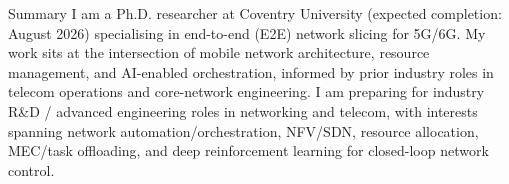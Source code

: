 \documentclass{resume}
\begin{document}
 \vspace{-5mm}

\begin{rSection}{Summary}
I am a Ph.D. researcher at Coventry University (expected completion: August 2026) specialising in end-to-end (E2E) network slicing for 5G/6G. My work sits at the intersection of mobile network architecture, resource management, and AI-enabled orchestration, informed by prior industry roles in telecom operations and core-network engineering. I am preparing for industry R\&D / advanced engineering roles in networking and telecom, with interests spanning network automation/orchestration, NFV/SDN, resource allocation, MEC/task offloading, and deep reinforcement learning for closed-loop network control.
\end{rSection}
\end{document}

